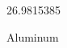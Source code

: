 \documentclass[12pt]{article}
\begin{document}
\hfill{}
\vfill
\begin{center}
  {\fontsize{50}{60}
  }

  \vspace{1em}

  26.9815385

Aluminum
\end{center}
\vfill
\end{document}
